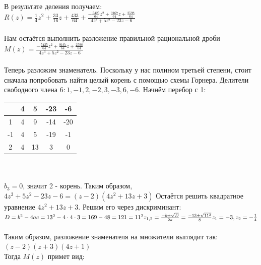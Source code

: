 \documentclass[12pt, a4paper]{article}
\begin{document}
    В результате деления получаем:\\
    \begin{math}
        R(z) = \frac{1}{4}z^2 + \frac{33}{16}z + \frac{433}{64} +
        \frac{-\frac{5425}{64}z^2 + \frac{9167}{64}z + \frac{2598}{64}}
        {4z^3 + 5z^2 - 23z - 6}
    \end{math}\\\\
    Нам остаётся выполнить разложение правильной рациональной дроби\\
    $M(z) = \frac{-\frac{5425}{64}z^2 + \frac{9167}{64}z + \frac{2598}{64}}
    {4z^3 + 5z^2 - 23z - 6}$\\\\
    Теперь разложим знаменатель. Поскольку у нас полином третьей степени,
    стоит сначала попробовать найти целый корень с помощью схемы Горнера. 
    Делители свободного члена
    $6: 1, -1, 2, -2, 3, -3, 6, -6$. Начнём перебор с 1:\\
    \begin{tabular}{|c|c|c|c|c|}
        \hline
            & 4 & 5 & -23 & -6\\
        \hline
        1   & 4 & 9 & -14 & -20\\
        \hline
        -1  & 4 & 5 & -19 & -1\\
        \hline
        2   & 4 &13 &  3  & 0\\
        \hline
    \end{tabular}\\\\
    $b_3 = 0$, значит 2 - корень. Таким образом,\\
    $4z^3 + 5z^2 - 23z - 6 = (z - 2)(4z^2 + 13z + 3)$
    Остаётся решить квадратное уравнение $4z^2 + 13z + 3$. Решим его
    через дискриминант:\\
    \begin{math}
        D = b^2 - 4ac = 13^2 - 4\cdot4\cdot3 = 169 - 48 = 121 = 11^2
        z_{1,2} = \frac{-b\pm \sqrt{D}}{2a} = \frac{-13\pm \sqrt{11^2}}{8}\\
        z_1 = -3, z_2 = -\frac{1}{4}
    \end{math}\\\\
    Таким образом, разложение знаменателя на множители выглядит так:\\
    $(z - 2)(z + 3)(4z + 1)$\\
    Тогда $M(z)$ примет вид:\\\\
\end{document}
